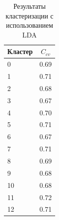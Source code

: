 \documentclass[14pt,a4paper]{article}
\begin{document}
\begin{table}[H]
\centering
\vspace{-1em}
\captionsetup{justification=raggedright, singlelinecheck=false}
\caption{Результаты кластеризации с использованием LDA}
\begin{tabular}{|l|l|}
\hline
\multicolumn{1}{|c|}{\textbf{Кластер}} & \multicolumn{1}{c|}{\textbf{$C_{cv}$}} \\ \hline
0                                                                                       & 0.69                                    \\ \hline
1                                                                                       & 0.71                                    \\ \hline
2                                                                                       & 0.68                                    \\ \hline
3                                                                                      & 0.67                                    \\ \hline
4                                                                                       & 0.70                                    \\ \hline
5                                                                                       & 0.71                                    \\ \hline
6                                                                                      & 0.67                                    \\ \hline
7                                                                                      & 0.71                                    \\ \hline
8                                                                                       & 0.69                                    \\ \hline
9                                                                                       & 0.68                                    \\ \hline
10                                                                                      & 0.68                                    \\ \hline
11                                                                                      & 0.72                                    \\ \hline
12                                                                                      & 0.71                                    \\ \hline

\end{tabular}
\end{table}
\end{document}
